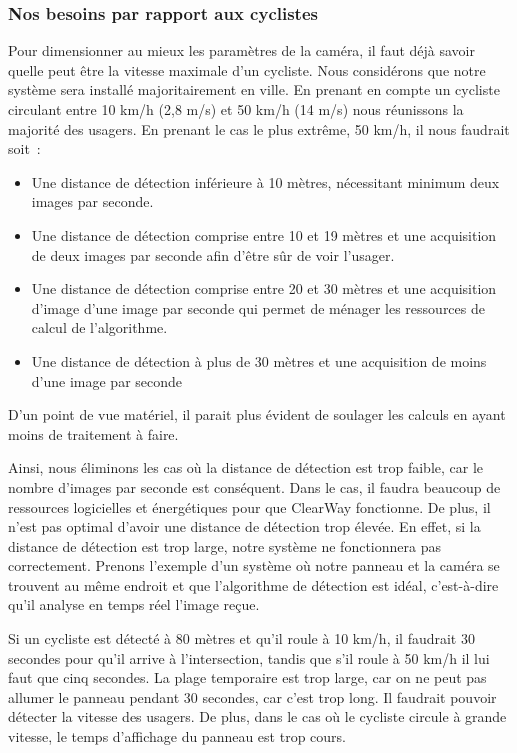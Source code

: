 \subsubsection{Nos besoins par rapport aux cyclistes}
\label{sec:camera_cycliste}

Pour dimensionner au mieux les paramètres de la caméra, il faut déjà savoir quelle peut être la vitesse maximale d’un cycliste.
Nous considérons que notre système sera installé majoritairement en ville.
En prenant en compte un cycliste circulant entre 10 km/h (2,8 m/s) et 50 km/h (14 m/s) nous réunissons la majorité des usagers.
En prenant le cas le plus extrême, 50 km/h, il nous faudrait soit :
\begin{itemize}
    \item Une distance de détection inférieure à 10 mètres, nécessitant minimum deux images par seconde.
    \item Une distance de détection comprise entre 10 et 19 mètres et une acquisition de deux images par seconde afin
          d’être sûr de voir l’usager.
    \item Une distance de détection comprise entre 20 et 30 mètres et une acquisition d’image d'une image par seconde qui permet
          de ménager les ressources de calcul de l’algorithme.
    \item Une distance de détection à plus de 30 mètres et une acquisition de moins d'une image par seconde
\end{itemize}
D'un point de vue matériel, il parait plus évident de soulager les calculs en ayant moins de traitement à faire.

Ainsi, nous éliminons les cas où la distance de détection est trop faible, car le nombre d'images par seconde est conséquent.
Dans le cas, il faudra beaucoup de ressources logicielles et énergétiques pour que ClearWay fonctionne.
De plus, il n'est pas optimal d'avoir une distance de détection trop élevée.
En effet, si la distance de détection est trop large, notre système ne fonctionnera pas correctement.
Prenons l'exemple d'un système où notre panneau et la caméra se trouvent au même endroit et que l'algorithme de détection est idéal,
c'est-à-dire qu'il analyse en temps réel l'image reçue.
\begin{example}
    Si un cycliste est détecté à 80 mètres et qu'il roule à 10 km/h, il faudrait 30 secondes pour qu'il arrive à l'intersection,
    tandis que s'il roule à 50 km/h il lui faut que cinq secondes. La plage temporaire est trop large,
    car on ne peut pas allumer le panneau pendant 30 secondes, car c'est trop long. Il faudrait pouvoir détecter la vitesse des usagers.
    De plus, dans le cas où le cycliste circule à grande vitesse, le temps d'affichage du panneau est trop cours.
\end{example}


